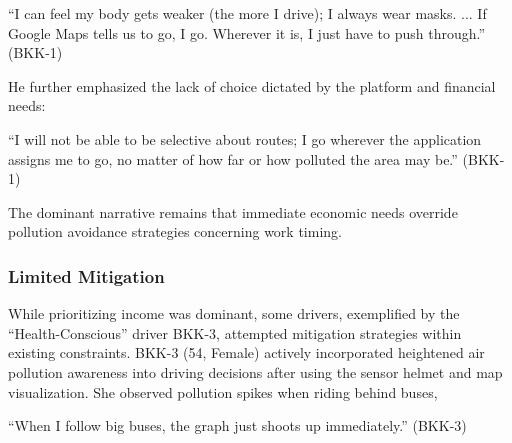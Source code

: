 \begin{quoteb}
    ``I can feel my body gets weaker (the more I drive); I always wear masks. ... If Google Maps tells us to go, I go. Wherever it is, I just have to push through.'' (BKK-1)
\end{quoteb}

He further emphasized the lack of choice dictated by the platform and financial needs:

\begin{quoteb}
    ``I will not be able to be selective about routes; I go wherever the application assigns me to go, no matter of how far or how polluted the area may be.'' (BKK-1)
\end{quoteb}



The dominant narrative remains that immediate economic needs override pollution avoidance strategies concerning work timing.

\subsubsection{Limited Mitigation}
While prioritizing income was dominant, some drivers, exemplified by the ``Health-Conscious'' driver BKK-3, attempted mitigation strategies within existing constraints.
BKK-3 (54, Female) actively incorporated heightened air pollution awareness into driving decisions after using the sensor helmet and map visualization.
She observed pollution spikes when riding behind buses,
\begin{quoteb}
    ``When I follow big buses, the graph just shoots up immediately.'' (BKK-3)
\end{quoteb}

